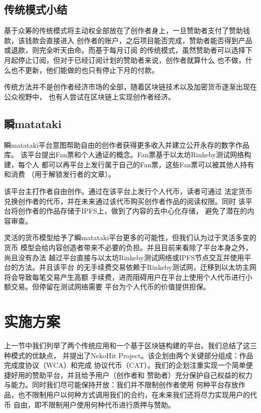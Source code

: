 \documentclass[11pt,UTF8,a4paper]{ctexart}
\begin{document}
    \subsection{传统模式小结}\label{subsec:tradition_summary}

    基于众筹的传统模式将主动权全部放在了创作者身上，一旦赞助者支付了赞助钱款，该钱款会直接进入
    创作者的账户，之后项目能否完成，赞助者能否得到产品或退款，则完全听天由命。而基于每月订阅
    的传统模式，虽然赞助者可以选择下月起停止订阅，但对于已经订阅计划的赞助者来说，创作者就算什么
    也不做，什么也不更新，他们能做的也只有停止下月的付款。

    传统方法并不是创作者经济市场的全部，随着区块链技术以及加密货币逐渐出现在公众视野中，
    也有人尝试在区块链上实现创作者经济。

    \subsection{瞬matataki}\label{subsec:blockchain_matataki}

    瞬matataki平台意图帮助自由的创作者获得更多收入并建立公开永存的数字作品库。
    该平台提出Fan票和个人通证的概念。Fan票基于以太坊Rinkeby测试网络构建，每个人
    都可以再平台上发行属于自己的Fan票，这些Fan票可以被其他人持有和消费
    （用于解锁发行者的文章）\cite{mitataki_fan_ticket}。

    该平台主打作者自由创作。通过在该平台上发行个人代币，读者可通过
    法定货币兑换创作者的代币，并在未来通过该代币购买创作者作品的阅读权限。同时
    该平台将创作者的作品存储于IPFS\cite{ipfs}上，做到了内容的去中心化存储，
    避免了潜在的内容审查。

    灵活的货币模型给予了瞬matataki平台更多的可能性，但我们认为过于灵活多变的货币
    模型会给内容创造者带来不必要的负担。并且目前来看除了平台本身之外，尚且没有办法
    越过平台直接与以太坊Rinkeby测试网络或IPFS节点交互并使用平台的方法。并且该平台
    的无手续费交易依赖于Rinkeby测试网，迁移到以太坊主网将会导致每笔交易产生高额
    手续费，进而阻碍用户在平台上使用个人代币进行小额交易。但停留在测试网络需要
    平台为个人代币的价值提供担保。


    \section{实施方案}\label{sec:solution}

    上一节中我们列举了两个传统应用和一个基于区块链构建的平台。我们总结了这三种模式的优缺点，
    并提出了NekoHit Project。该企划由两个关键部分组成：作品完成度协议（WCA）和完成
    协议代币（CAT）。我们的企划注重实现一个简单便捷好用的赞助平台，并且给予用户（创作者和
    赞助者）充分保护自己权益的权力与能力。同时我们尽可能保持开放：我们并不限制创作者使用
    何种平台存放作品，也不限制用户以何种方式调用我们的合约，在未来我们还将尽力实现用户的代币
    自由，即不限制用户使用何种代币进行质押与赞助。
\end{document}
